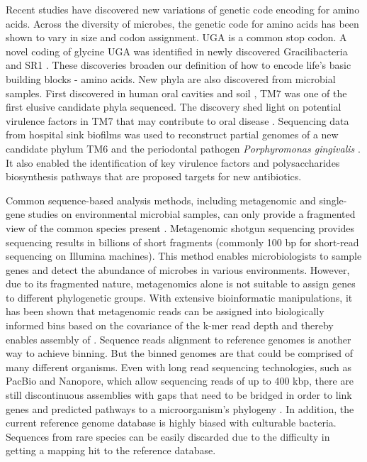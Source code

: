 Recent studies have discovered new variations of genetic code encoding for amino acids. Across the diversity of microbes, the genetic code for amino acids has been shown to vary in size and codon assignment\cite{Prat:2012ef}. UGA is a common stop codon. A novel coding of glycine UGA was identified in newly discovered Gracilibacteria and SR1 \cite{Rinke:2013bt,Campbell:2016jq}. These discoveries broaden our definition of how to encode life's basic building blocks - amino acids. New phyla are also discovered from microbial samples. First discovered in human oral cavities \cite{Marcy:2007il} and soil \cite{Podar:2009ks}, TM7 was one of the first elusive candidate phyla sequenced. The discovery shed light on potential virulence factors in TM7 that may contribute to oral disease \cite{Marcy:2007il}. Sequencing data from hospital sink biofilms was used to reconstruct partial genomes of a new candidate phylum TM6 and the periodontal pathogen \textit{Porphyromonas gingivalis} \cite{McLean:2013ev,McLean:2013kq}. It also enabled the identification of key virulence factors and polysaccharides biosynthesis pathways that are proposed targets for new antibiotics. 


Common sequence-based analysis methods, including metagenomic and single-gene studies on environmental microbial samples, can only provide a fragmented view of the common species present \cite{Blainey:2013dp}. Metagenomic shotgun sequencing provides sequencing results in billions of short fragments (commonly 100 bp for short-read sequencing on Illumina machines). This method enables microbiologists to sample genes and detect the abundance of microbes in various environments. However, due to its fragmented nature, metagenomics alone is not suitable to assign genes to different phylogenetic groups. With extensive bioinformatic manipulations, it has been shown that metagenomic reads can be assigned into biologically informed bins based on the covariance of the k-mer read depth and thereby enables assembly of  \cite{Cleary:2015um}. Sequence reads alignment to reference genomes is another way to achieve binning. But the binned genomes are  that could be comprised of many different organisms. Even with long read sequencing technologies, such as PacBio and Nanopore, which allow sequencing reads of up to 400 kbp, there are still discontinuous assemblies with gaps that need to be bridged in order to link genes and predicted pathways to a microorganism's phylogeny \cite{Clingenpeel:2015bf}. In addition, the current reference genome database is highly biased with culturable bacteria. Sequences from rare species can be easily discarded due to the difficulty in getting a mapping hit to the reference database.

